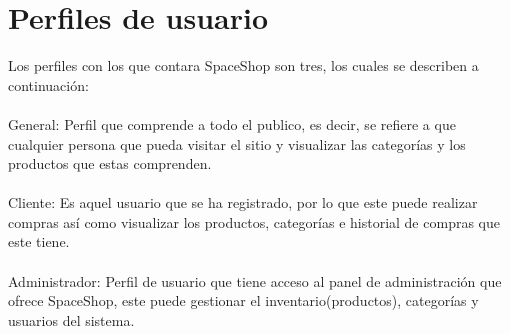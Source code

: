 \chapter{Perfiles de usuario}

Los perfiles con los que contara SpaceShop son tres, los cuales se describen a continuación:\\ \\


\hypertarget{General}{General:} Perfil que comprende a todo el publico, es decir, se refiere a que cualquier persona que pueda visitar el sitio y visualizar las categorías y los productos que estas comprenden. \\ \\

\hypertarget{Cliente}{Cliente:} Es aquel usuario que se ha registrado, por lo que este puede realizar compras as\'i como visualizar los productos, categorías e historial de compras que este tiene. \\ \\

\hypertarget{Administrador}{Administrador:} Perfil de usuario que tiene acceso al panel de administración que ofrece SpaceShop, este puede gestionar el inventario(productos), categorías y usuarios del sistema. \\ 
